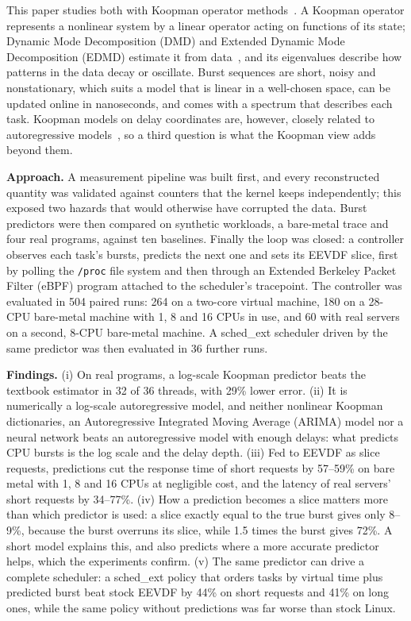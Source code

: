 \documentclass[conference,onecolumn,11pt]{IEEEtran}
\begin{document}
This paper studies both with Koopman operator methods~\cite{koopman1931,mezic2005,brunton2022}. A Koopman operator represents a nonlinear system by a linear operator acting on functions of its state; Dynamic Mode Decomposition (DMD) and Extended Dynamic Mode Decomposition (EDMD) estimate it from data~\cite{schmid2010,williams2015}, and its eigenvalues describe how patterns in the data decay or oscillate. Burst sequences are short, noisy and nonstationary, which suits a model that is linear in a well-chosen space, can be updated online in nanoseconds, and comes with a spectrum that describes each task. Koopman models on delay coordinates are, however, closely related to autoregressive models~\cite{arbabi2017,pan2020}, so a third question is what the Koopman view adds beyond them.

\textbf{Approach.} A measurement pipeline was built first, and every reconstructed quantity was validated against counters that the kernel keeps independently; this exposed two hazards that would otherwise have corrupted the data. Burst predictors were then compared on synthetic workloads, a bare-metal trace and four real programs, against ten baselines. Finally the loop was closed: a controller observes each task's bursts, predicts the next one and sets its EEVDF slice, first by polling the \texttt{/proc} file system and then through an Extended Berkeley Packet Filter (eBPF) program attached to the scheduler's tracepoint. The controller was evaluated in 504 paired runs: 264 on a two-core virtual machine, 180 on a 28-CPU bare-metal machine with 1, 8 and 16 CPUs in use, and 60 with real servers on a second, 8-CPU bare-metal machine. A sched\_ext scheduler driven by the same predictor was then evaluated in 36 further runs.

\textbf{Findings.} (i) On real programs, a log-scale Koopman predictor beats the textbook estimator in 32 of 36 threads, with 29\% lower error. (ii) It is numerically a log-scale autoregressive model, and neither nonlinear Koopman dictionaries, an Autoregressive Integrated Moving Average (ARIMA) model nor a neural network beats an autoregressive model with enough delays: what predicts CPU bursts is the log scale and the delay depth. (iii) Fed to EEVDF as slice requests, predictions cut the response time of short requests by 57--59\% on bare metal with 1, 8 and 16 CPUs at negligible cost, and the latency of real servers' short requests by 34--77\%. (iv) How a prediction becomes a slice matters more than which predictor is used: a slice exactly equal to the true burst gives only 8--9\%, because the burst overruns its slice, while 1.5 times the burst gives 72\%. A short model explains this, and also predicts where a more accurate predictor helps, which the experiments confirm. (v) The same predictor can drive a complete scheduler: a sched\_ext policy that orders tasks by virtual time plus predicted burst beat stock EEVDF by 44\% on short requests and 41\% on long ones, while the same policy without predictions was far worse than stock Linux.
\end{document}
